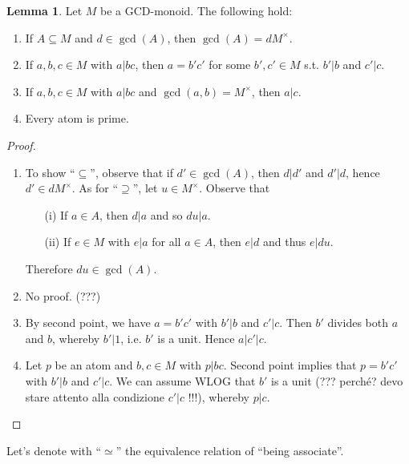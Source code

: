 \documentclass[12pt,a4paper]{report}
\theoremstyle{definition}
\newtheorem{lemma}[theorem]{Lemma}
\theoremstyle{num.custom-title}
\DeclareMathOperator{\sse}{\subseteq}
\begin{document}
\begin{lemma}\label{lemma_gcd-monoid}
Let $M$ be a GCD-monoid. The following hold:
\begin{enumerate}
\item If $A \sse M$ and $d \in \gcd(A)$, then $\gcd(A)=dM^\times$.
\item If $a,b,c \in M$ with $a|bc$, then $a=b'c'$ for some $b',c' \in M$ s.t. $b'|b$ and $c'|c$.
\item If $a,b,c \in M$ with $a|bc$ and $\gcd(a,b)=M^\times$, then $a|c$.
\item Every atom is prime.
\end{enumerate}
\begin{proof}\ 
\begin{enumerate}
\item To show ``$\sse$'', observe that if $d' \in \gcd(A)$, then $d|d'$ and $d'|d$, hence $d' \in dM^\times$. As for ``$\supseteq$'', let $u \in M^\times$. Observe that
\begin{enumerate}
\item[(i)] If $a \in A$, then $d|a$ and so $du|a$.
\item[(ii)] If $e \in M$ with $e|a$ for all $a \in A$, then $e|d$ and thus $e|du$.
\end{enumerate}
Therefore $du \in \gcd(A)$.
\item No proof. (???)
\item By second point, we have $a=b'c'$ with $b'|b$ and $c'|c$. Then $b'$ divides both $a$ and $b$, whereby $b'|1$, i.e. $b'$ is a unit. Hence $a|c'|c$.
\item Let $p$ be an atom and $b,c \in M$ with $p|bc$. Second point implies that $p=b'c'$ with $b'|b$ and $c'|c$. We can assume WLOG that $b'$ is a unit (??? perché? devo stare attento alla condizione $c'|c$ !!!), whereby $p|c$.
\end{enumerate}
\end{proof}
\end{lemma}

Let's denote with ``$\simeq$'' the equivalence relation of ``being associate''.
\end{document}
